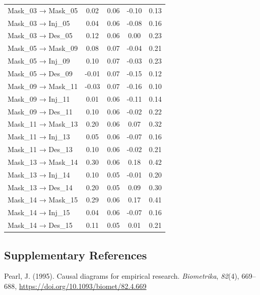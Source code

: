 \documentclass[
  english,
  man,floatsintext]{apa6}
\begin{document}
\begin{center}
\begin{ThreePartTable}
\begin{longtable}{lcccc}
Mask\_03 → Mask\_05 & 0.02 & 0.06 & -0.10 & 0.13\\
Mask\_03 → Inj\_05 & 0.04 & 0.06 & -0.08 & 0.16\\
Mask\_03 → Des\_05 & 0.12 & 0.06 & 0.00 & 0.23\\
Mask\_05 → Mask\_09 & 0.08 & 0.07 & -0.04 & 0.21\\
Mask\_05 → Inj\_09 & 0.10 & 0.07 & -0.03 & 0.23\\
Mask\_05 → Des\_09 & -0.01 & 0.07 & -0.15 & 0.12\\
Mask\_09 → Mask\_11 & -0.03 & 0.07 & -0.16 & 0.10\\
Mask\_09 → Inj\_11 & 0.01 & 0.06 & -0.11 & 0.14\\
Mask\_09 → Des\_11 & 0.10 & 0.06 & -0.02 & 0.22\\
Mask\_11 → Mask\_13 & 0.20 & 0.06 & 0.07 & 0.32\\
Mask\_11 → Inj\_13 & 0.05 & 0.06 & -0.07 & 0.16\\
Mask\_11 → Des\_13 & 0.10 & 0.06 & -0.02 & 0.21\\
Mask\_13 → Mask\_14 & 0.30 & 0.06 & 0.18 & 0.42\\
Mask\_13 → Inj\_14 & 0.10 & 0.05 & -0.01 & 0.20\\
Mask\_13 → Des\_14 & 0.20 & 0.05 & 0.09 & 0.30\\
Mask\_14 → Mask\_15 & 0.29 & 0.06 & 0.17 & 0.41\\
Mask\_14 → Inj\_15 & 0.04 & 0.06 & -0.07 & 0.16\\
Mask\_14 → Des\_15 & 0.11 & 0.05 & 0.01 & 0.21\\
\bottomrule
\end{longtable}

\end{ThreePartTable}
\end{center}

\newpage

\hypertarget{supplementary-references}{%
\subsection{Supplementary References}\label{supplementary-references}}

Pearl, J. (1995). Causal diagrams for empirical research. \emph{Biometrika}, \emph{82}(4), 669--688, \url{https://doi.org/10.1093/biomet/82.4.669}
\end{document}
